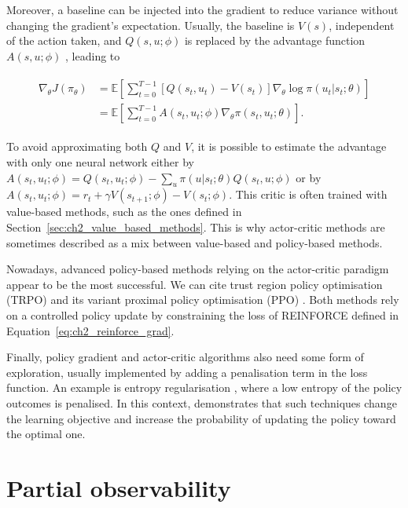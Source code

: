 Moreover, a baseline can be injected into the gradient to reduce variance without changing the gradient's expectation.
Usually, the baseline is  $V(s)$, independent of the action taken, and $Q(s, u;\phi)$ is replaced by the advantage function $A(s,u; \phi)$ \citep{10.5555/2074022.2074088}, leading to

\begin{align}
\begin{split}
\label{eq:ch2_baseline_actor_crit}
    \nabla_\theta J(\pi_\theta)
    & = \mathbb{E}\left[\sum_{t=0}^{T-1} [Q(s_t, u_t) - V(s_t)] \nabla_\theta \log \pi(u_t|s_t;\theta)\right]\\
    & = \mathbb{E} \left[\sum_{t=0}^{T-1} A(s_t, u_t; \phi) \nabla_\theta \pi(s_t, u_t; \theta)\right].
\end{split}
\end{align}

To avoid approximating both $Q$ and $V$, it is possible to estimate the advantage with only one neural network either by $A(s_t,u_t; \phi)=Q(s_t, u_t;\phi)-\sum_u \pi(u|s_t;\theta) Q(s_t,u; \phi)$ or by $A(s_t,u_t; \phi)=r_t +\gamma V(s_{t+1};\phi) - V(s_t;\phi)$.
This critic is often trained with value-based methods, such as the ones defined in Section~\ref{sec:ch2_value_based_methods}.
This is why actor-critic methods are sometimes described as a mix between value-based and policy-based methods.

Nowadays, advanced policy-based methods relying on the actor-critic paradigm appear to be the most successful.
We can cite trust region policy optimisation (TRPO) \citep{schulman2015trust} and its variant proximal policy optimisation (PPO) \citep{schulman2017ppo}.
Both methods rely on a controlled policy update by constraining the loss of REINFORCE defined in Equation~\ref{eq:ch2_reinforce_grad}.

Finally, policy gradient and actor-critic algorithms also need some form of exploration, usually implemented by adding a penalisation term in the loss function. 
An example is entropy regularisation \citep{williams1991function}, where a low entropy of the policy outcomes is penalised.
In this context, \cite{bolland2024behind} demonstrates that such techniques change the learning objective and increase the probability of updating the policy toward the optimal one.

\section{Partial observability} \label{sec:ch2_partial_observability}

